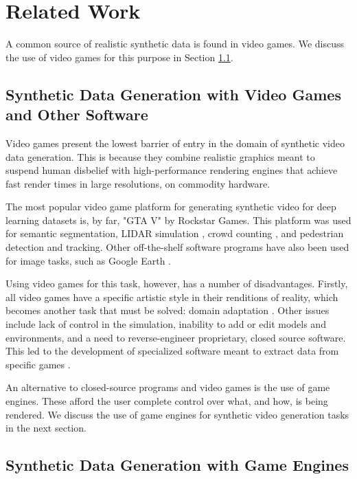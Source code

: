 \chapter{Related Work}
\label{chapter:related}

A common source of realistic synthetic data is found in video games. We discuss the use of video games for this purpose in Section \ref{sec:video-games}.

\section{Synthetic Data Generation with Video Games and Other Software}
\label{sec:video-games}

Video games present the lowest barrier of entry in the domain of synthetic video data generation. This is because they combine realistic graphics meant to suspend human disbelief with high-performance rendering engines that achieve fast render times in large resolutions, on commodity hardware.

The most popular video game platform for generating synthetic video for deep learning datasets is, by far, "GTA V" by Rockstar Games. This platform was used for semantic segmentation\cite{richter2016playing}, LIDAR simulation \cite{hurl2019precise}, crowd counting \cite{wang2019learning}, and pedestrian detection and tracking\cite{Fabbri_2021_ICCV}. Other off-the-shelf software programs have also been used for image tasks, such as Google Earth \cite{marcu2018safeuav}.

Using video games for this task, however, has a number of disadvantages. Firstly, all video games have a specific artistic style in their renditions of reality, which becomes another task that must be solved: domain adaptation \cite{wu2019squeezesegv2,wang2019learning}. Other issues include lack of control in the simulation, inability to add or edit models and environments, and a need to reverse-engineer proprietary, closed source software. This led to the development of specialized software meant to extract data from specific games \cite{doan2018g2d}.

An alternative to closed-source programs and video games is the use of game engines. These afford the user complete control over what, and how, is being rendered. We discuss the use of game engines for synthetic video generation tasks in the next section.

\section{Synthetic Data Generation with Game Engines}
\label{sec:graphics-engines}

